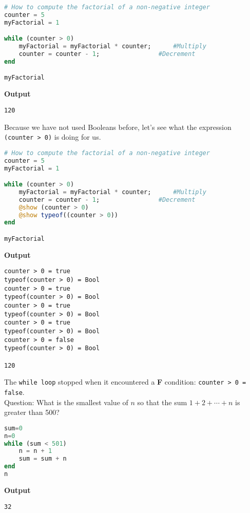\begin{lstlisting}[language=Julia,style=mystyle]
# How to compute the factorial of a non-negative integer
counter = 5
myFactorial = 1

while (counter > 0)
    myFactorial = myFactorial * counter;      #Multiply
    counter = counter - 1;                #Decrement
end

myFactorial
\end{lstlisting}
\textbf{Output} 
\begin{verbatim}
120
\end{verbatim}

Because we have not used Booleans before, let's see what the expression \texttt{(counter > 0)} is doing for us.

\begin{lstlisting}[language=Julia,style=mystyle]
# How to compute the factorial of a non-negative integer
counter = 5
myFactorial = 1

while (counter > 0)
    myFactorial = myFactorial * counter;      #Multiply
    counter = counter - 1;                #Decrement
    @show (counter > 0)
    @show typeof((counter > 0))
end

myFactorial
\end{lstlisting}
\textbf{Output} 
\begin{verbatim}
counter > 0 = true
typeof(counter > 0) = Bool
counter > 0 = true
typeof(counter > 0) = Bool
counter > 0 = true
typeof(counter > 0) = Bool
counter > 0 = true
typeof(counter > 0) = Bool
counter > 0 = false
typeof(counter > 0) = Bool

120
\end{verbatim}
The \texttt{while\,loop} stopped when it encountered a \textbf{F} condition: \texttt{counter > 0 = false}.\\

Question: What is the smallest value of $n$ so that the sum $1 + 2 + \cdots + n$ is greater than 500?

\begin{lstlisting}[language=Julia,style=mystyle]
sum=0
n=0
while (sum < 501)
    n = n + 1
    sum = sum + n
end
n
\end{lstlisting}
\textbf{Output} 
\begin{verbatim}
32
\end{verbatim}

